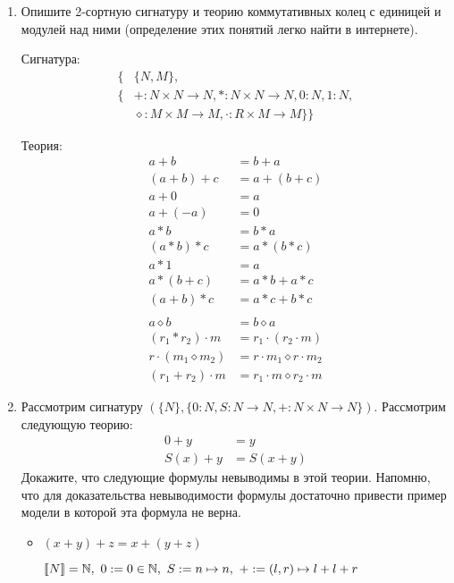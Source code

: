 \begin{enumerate}

\item Опишите 2-сортную сигнатуру и теорию коммутативных колец с единицей и модулей над ними (определение этих 
понятий легко найти в интернете).

Сигнатура: 
\begin{align*}
\{ &\{N, M\}, \\ 
\{
&+:N \times N \rightarrow N, *:N \times N \rightarrow N, 
0:N, 
1:N,\\
&\diamond : M\times M \rightarrow M, 
\cdot:R\times M \rightarrow M 
\}\}
\end{align*}
						   
Теория:
\begin{align*}
	a + b &= b + a \\
	(a + b) + c &= a + (b + c) \\
	a + 0 &= a \\
	a + (-a) &= 0 \\
	a * b &= b * a \\
	(a * b) * c &= a * (b * c) \\
	a * 1 &= a \\
	a * (b + c) &= a * b + a * c \\
	(a + b) * c &= a * c + b * c \\
	\\
	a \diamond b &= b \diamond a \\
	(r_1 * r_2) \cdot m &= r_1 \cdot (r_2 \cdot m) \\
	r\cdot (m_1 \diamond m_2) &= r\cdot m_1 \diamond r \cdot m_2 \\
	(r_1 + r_2) \cdot m &= r_1 \cdot m \diamond r_2 \cdot m
\end{align*}


\item Рассмотрим сигнатуру $(\{N\}, \{ 0 : N, S : N \to N, + : N \times N \to N \})$.
    Рассмотрим следующую теорию:
\begin{align*}
0 + y & = y \\
S(x) + y & = S(x + y)
\end{align*}
Докажите, что следующие формулы невыводимы в этой теории. Напомню, что для доказательства невыводимости формулы 
достаточно привести пример модели в которой эта формула не верна.
\begin{itemize}
\item $(x + y) + z = x + (y + z)$

$\llb N \rrb = \mathbb{N}, \
0 := 0 \in \mathbb{N},\
S := n \mapsto n, \ 
+ := (l, r) \mapsto l + l + r$


\end{itemize}
\end{enumerate}
